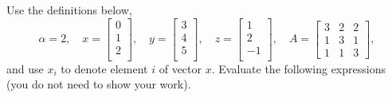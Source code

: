 \documentclass{article}
\def\blu#1{{\color{blu}#1}}
\begin{document}
	Use the definitions below,
	\[
	\alpha = 2,\quad
	x = \left[\begin{array}{c}
		0\\
		1\\
		2\\
	\end{array}\right], \quad
	y = \left[\begin{array}{c}
		3\\
		4\\
		5\\
	\end{array}\right],\quad
	z = \left[\begin{array}{c}
		1\\
		2\\
		-1\\
	\end{array}\right],\quad
	A = \left[\begin{array}{ccc}
		3 & 2 & 2\\
		1 & 3 & 1\\
		1 & 1 & 3
	\end{array}\right],
	\]
	and use $x_i$ to denote element $i$ of vector $x$.
	\blu{Evaluate the following expressions} (you do not need to show your work).
\end{document}
